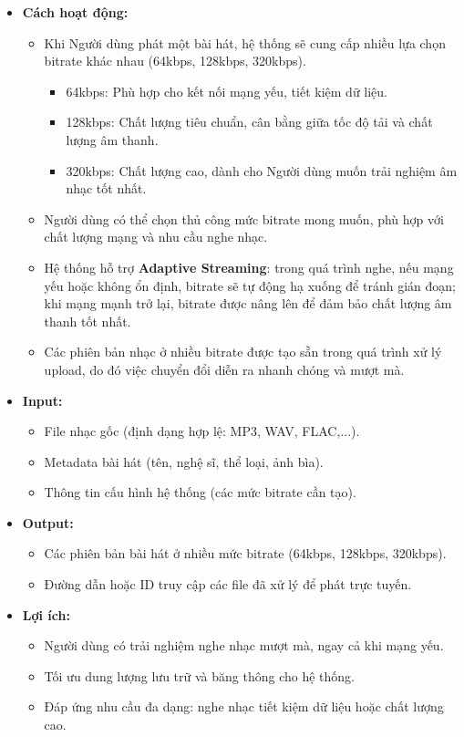 \documentclass[a4paper]{article}
\begin{document}
\begin{itemize}
   \item \textbf{Cách hoạt động:}
\begin{itemize}
    \item Khi Người dùng phát một bài hát, hệ thống sẽ cung cấp nhiều lựa chọn bitrate khác nhau (64kbps, 128kbps, 320kbps).
    \begin{itemize}
        \item 64kbps: Phù hợp cho kết nối mạng yếu, tiết kiệm dữ liệu.
        \item 128kbps: Chất lượng tiêu chuẩn, cân bằng giữa tốc độ tải và chất lượng âm thanh.
        \item 320kbps: Chất lượng cao, dành cho Người dùng muốn trải nghiệm âm nhạc tốt nhất.
    \end{itemize}
    \item Người dùng có thể chọn thủ công mức bitrate mong muốn, phù hợp với chất lượng mạng và nhu cầu nghe nhạc.
    \item Hệ thống hỗ trợ \textbf{Adaptive Streaming}: trong quá trình nghe, nếu mạng yếu hoặc không ổn định, bitrate sẽ tự động hạ xuống để tránh gián đoạn; khi mạng mạnh trở lại, bitrate được nâng lên để đảm bảo chất lượng âm thanh tốt nhất.
    \item Các phiên bản nhạc ở nhiều bitrate được tạo sẵn trong quá trình xử lý upload, do đó việc chuyển đổi diễn ra nhanh chóng và mượt mà.
\end{itemize}
\item \textbf{Input:}
\begin{itemize}
    \item File nhạc gốc (định dạng hợp lệ: MP3, WAV, FLAC,...).
    \item Metadata bài hát (tên, nghệ sĩ, thể loại, ảnh bìa).
    \item Thông tin cấu hình hệ thống (các mức bitrate cần tạo).
\end{itemize}

\item \textbf{Output:}
\begin{itemize}
    \item Các phiên bản bài hát ở nhiều mức bitrate (64kbps, 128kbps, 320kbps).
    \item Đường dẫn hoặc ID truy cập các file đã xử lý để phát trực tuyến.
\end{itemize}


\item \textbf{Lợi ích:}
\begin{itemize}
    \item Người dùng có trải nghiệm nghe nhạc mượt mà, ngay cả khi mạng yếu.
    \item Tối ưu dung lượng lưu trữ và băng thông cho hệ thống.
    \item Đáp ứng nhu cầu đa dạng: nghe nhạc tiết kiệm dữ liệu hoặc chất lượng cao.
\end{itemize}
\end{itemize}
\end{document}
